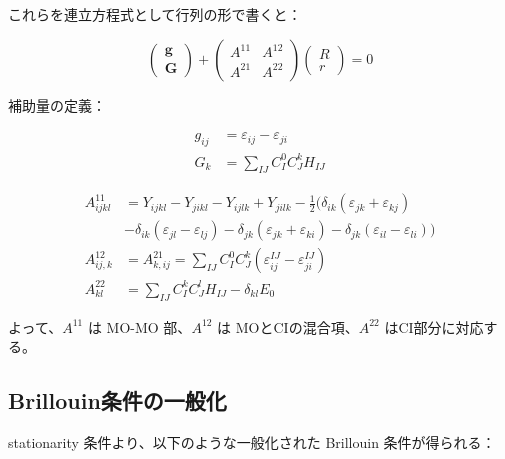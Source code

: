 \documentclass{article}
\begin{document}
これらを連立方程式として行列の形で書くと：

\begin{equation}
\begin{pmatrix}
\mathbf{g} \\
\mathbf{G}
\end{pmatrix}
+
\begin{pmatrix}
A^{11} & A^{12} \\
A^{21} & A^{22}
\end{pmatrix}
\begin{pmatrix}
R \\
r
\end{pmatrix}
= 0
\label{eq:68}
\end{equation}

補助量の定義：

\begin{align}
g_{ij} &= \varepsilon_{ij} - \varepsilon_{ji} \label{eq:69} \\
G_k &= \sum_{IJ} C_I^0 C_J^k H_{IJ} \label{eq:70}
\end{align}

\begin{align}
A^{11}_{ijkl} &= Y_{ijkl} - Y_{jikl} - Y_{ijlk} + Y_{jilk}- \frac{1}{2} (\delta_{ik} (\varepsilon_{jk} + \varepsilon_{kj}) \\
&
-  \delta_{ik} (\varepsilon_{jl} - \varepsilon_{lj})- \delta_{jk} (\varepsilon_{jk} + \varepsilon_{ki}) - \delta_{jk} (\varepsilon_{il} - \varepsilon_{li}))\\
A^{12}_{ij,k} &= A^{21}_{k,ij} = \sum_{IJ} C_I^0 C_J^k (\varepsilon_{ij}^{IJ} - \varepsilon_{ji}^{IJ})\\
A^{22}_{kl} &= \sum_{IJ} C_I^k C_J^l H_{IJ} - \delta_{kl} E_0
\end{align}

よって、$A^{11}$ は MO-MO 部、$A^{12}$ は MOとCIの混合項、$A^{22}$ はCI部分に対応する。

\subsection*{Brillouin条件の一般化}

stationarity 条件より、以下のような一般化された Brillouin 条件が得られる：
\end{document}
